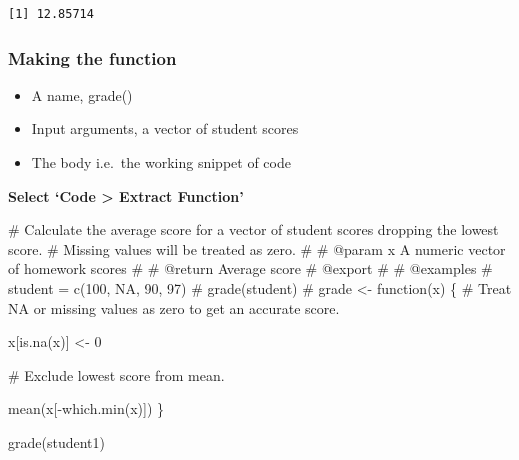 \documentclass[
  letterpaper,
  DIV=11,
  numbers=noendperiod]{scrartcl}
\newenvironment{Shaded}{\begin{snugshade}}{\end{snugshade}}
\newcommand{\CommentTok}[1]{\textcolor[rgb]{0.37,0.37,0.37}{#1}}
\newcommand{\ControlFlowTok}[1]{\textcolor[rgb]{0.00,0.23,0.31}{#1}}
\newcommand{\DecValTok}[1]{\textcolor[rgb]{0.68,0.00,0.00}{#1}}
\newcommand{\FunctionTok}[1]{\textcolor[rgb]{0.28,0.35,0.67}{#1}}
\newcommand{\NormalTok}[1]{\textcolor[rgb]{0.00,0.23,0.31}{#1}}
\newcommand{\OtherTok}[1]{\textcolor[rgb]{0.00,0.23,0.31}{#1}}
\newcommand{\SpecialCharTok}[1]{\textcolor[rgb]{0.37,0.37,0.37}{#1}}
\providecommand{\tightlist}{%
  \setlength{\itemsep}{0pt}\setlength{\parskip}{0pt}}\usepackage{longtable,booktabs,array}
\begin{document}
\begin{verbatim}
[1] 12.85714
\end{verbatim}

\hypertarget{making-the-function}{%
\subsubsection{Making the function}\label{making-the-function}}

\begin{itemize}
\tightlist
\item
  A name, grade()
\item
  Input arguments, a vector of student scores
\item
  The body i.e.~the working snippet of code
\end{itemize}

\textbf{Select `Code \textgreater{} Extract Function'}

\begin{Shaded}
\begin{Highlighting}[]
\CommentTok{\#\textquotesingle{} Calculate the average score for a vector of student scores dropping the lowest score.}
\CommentTok{\#\textquotesingle{} Missing values will be treated as zero.}
\CommentTok{\#\textquotesingle{} }
\CommentTok{\#\textquotesingle{} @param x A numeric vector of homework scores}
\CommentTok{\#\textquotesingle{}}
\CommentTok{\#\textquotesingle{} @return Average score}
\CommentTok{\#\textquotesingle{} @export}
\CommentTok{\#\textquotesingle{}}
\CommentTok{\#\textquotesingle{} @examples}
\CommentTok{\#\textquotesingle{} student = c(100, NA, 90, 97)}
\CommentTok{\#\textquotesingle{} grade(student)}
\CommentTok{\#\textquotesingle{} }
\NormalTok{grade }\OtherTok{\textless{}{-}} \ControlFlowTok{function}\NormalTok{(x) \{}
  \CommentTok{\# Treat NA or missing values as zero to get an accurate score.}
  
\NormalTok{  x[}\FunctionTok{is.na}\NormalTok{(x)] }\OtherTok{\textless{}{-}} \DecValTok{0}
  
  \CommentTok{\# Exclude lowest score from mean.}
  
  \FunctionTok{mean}\NormalTok{(x[}\SpecialCharTok{{-}}\FunctionTok{which.min}\NormalTok{(x)])}
\NormalTok{\}}
\end{Highlighting}
\end{Shaded}

\begin{Shaded}
\begin{Highlighting}[]
\FunctionTok{grade}\NormalTok{(student1)}
\end{Highlighting}
\end{Shaded}
\end{document}
